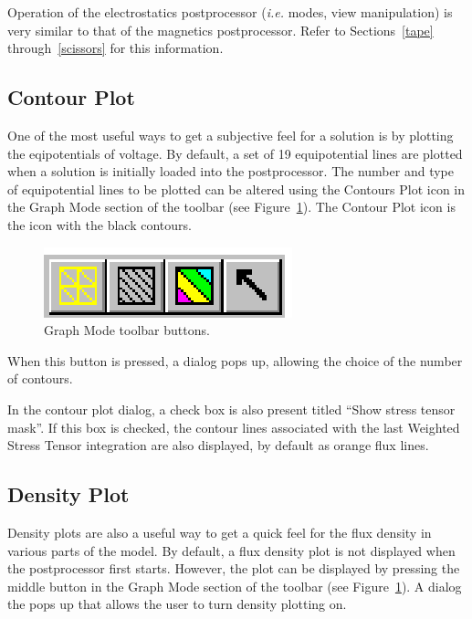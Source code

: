\documentclass[12pt]{report}
\begin{document}
Operation of the electrostatics postprocessor ({\em i.e.} modes, view manipulation) is
very similar to that of the magnetics postprocessor.  Refer to
Sections~\ref{tape} through~\ref{scissors} for this information.

\subsection{Contour Plot}

One of the most useful ways to get a subjective feel for a solution
is by plotting the eqipotentials of voltage. By default, a set of
19 equipotential lines are plotted when a solution is initially
loaded into the postprocessor. The number and type of equipotential
lines to be plotted can be altered using the Contours Plot icon in
the Graph Mode section of the toolbar (see Figure~\ref{fig17}). The
Contour Plot icon is the icon with the black contours.

\begin{figure}[htbp]
\centerline{\includegraphics{hplotbar.ps}}
\caption{Graph Mode toolbar buttons.}
\label{fig17}
\end{figure}




When this button is pressed, a dialog pops up, allowing the choice of the
number of contours.





In the contour plot dialog, a check box is also present titled ``Show stress
tensor mask''. If this box is checked, the contour lines associated with the
last Weighted Stress Tensor integration are also displayed, by default as
orange flux lines.

\subsection{Density Plot}

Density plots are also a useful way to get a quick feel for the
flux density in various parts of the model. By default, a flux
density plot is not displayed when the postprocessor first starts.
However, the plot can be displayed by pressing the middle button in
the Graph Mode section of the toolbar (see Figure~\ref{fig17}). A
dialog the pops up that allows the user to turn density plotting
on.
\end{document}
